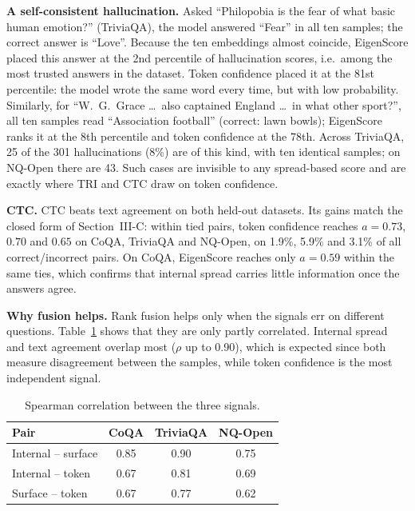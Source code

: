 \documentclass[journal]{IEEEtran}
\begin{document}
\textbf{A self-consistent hallucination.} Asked ``Philopobia is the fear of what basic human emotion?'' (TriviaQA), the model answered ``Fear'' in all ten samples; the correct answer is ``Love''. Because the ten embeddings almost coincide, EigenScore placed this answer at the 2nd percentile of hallucination scores, i.e.\ among the most trusted answers in the dataset. Token confidence placed it at the 81st percentile: the model wrote the same word every time, but with low probability. Similarly, for ``W.~G.~Grace \ldots\ also captained England \ldots\ in what other sport?'', all ten samples read ``Association football'' (correct: lawn bowls); EigenScore ranks it at the 8th percentile and token confidence at the 78th. Across TriviaQA, 25 of the 301 hallucinations (8\%) are of this kind, with ten identical samples; on NQ-Open there are 43. Such cases are invisible to any spread-based score and are exactly where TRI and CTC draw on token confidence.

\textbf{CTC.} CTC beats text agreement on both held-out datasets. Its gains match the closed form of Section~III-C: within tied pairs, token confidence reaches $a=0.73$, $0.70$ and $0.65$ on CoQA, TriviaQA and NQ-Open, on 1.9\%, 5.9\% and 3.1\% of all correct/incorrect pairs. On CoQA, EigenScore reaches only $a=0.59$ within the same ties, which confirms that internal spread carries little information once the answers agree.

\textbf{Why fusion helps.} Rank fusion helps only when the signals err on different questions. Table~\ref{tab:rho} shows that they are only partly correlated. Internal spread and text agreement overlap most ($\rho$ up to 0.90), which is expected since both measure disagreement between the samples, while token confidence is the most independent signal.

\begin{table}[t]
\centering
\caption{Spearman correlation between the three signals.}
\label{tab:rho}
\footnotesize
\begin{tabular}{@{}lccc@{}}
\toprule
Pair & CoQA & TriviaQA & NQ-Open \\
\midrule
Internal -- surface & 0.85 & 0.90 & 0.75 \\
Internal -- token & 0.67 & 0.81 & 0.69 \\
Surface -- token & 0.67 & 0.77 & 0.62 \\
\bottomrule
\end{tabular}
\end{table}
\end{document}
